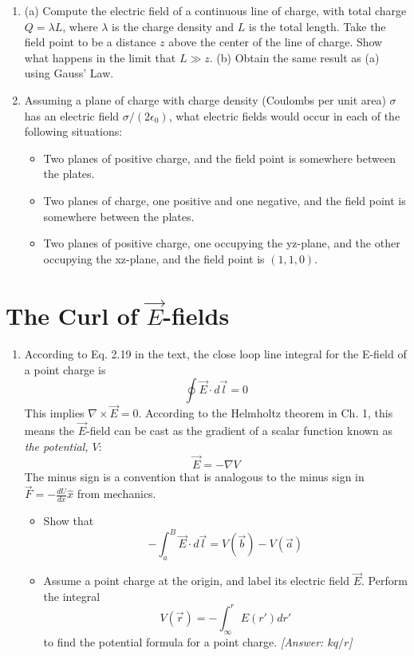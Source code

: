 \documentclass[10pt]{article}
\begin{document}
\begin{enumerate}
\item (a) Compute the electric field of a continuous line of charge, with total charge $Q = \lambda L$, where $\lambda$ is the charge density and $L$ is the total length.  Take the field point to be a distance $z$ above the center of the line of charge.  Show what happens in the limit that $L \gg z$. (b) Obtain the same result as (a) using Gauss' Law. \\ \vspace{5cm}
\item Assuming a plane of charge with charge density (Coulombs per unit area) $\sigma$ has an electric field $\sigma/(2\epsilon_0)$, what electric fields would occur in each of the following situations:
\begin{itemize}
\item Two planes of positive charge, and the field point is somewhere between the plates.
\item Two planes of charge, one positive and one negative, and the field point is somewhere between the plates.
\item Two planes of positive charge, one occupying the yz-plane, and the other occupying the xz-plane, and the field point is $(1,1,0)$.
\end{itemize}
\vspace{3cm}
\end{enumerate}

\section{The Curl of $\vec{E}$-fields}

\begin{enumerate}
\item According to Eq. 2.19 in the text, the close loop line integral for the E-field of a point charge is 
\begin{equation}
\oint \vec{E} \cdot d\vec{l} = 0
\end{equation}
This implies $\nabla \times \vec{E} = 0$.  According to the Helmholtz theorem in Ch. 1, this means the $\vec{E}$-field can be cast as the gradient of a scalar function known as \textit{the potential, $V$}:
\begin{equation}
\vec{E} = -\nabla V
\end{equation}
The minus sign is a convention that is analogous to the minus sign in $\vec{F} = - \frac{dU}{dx} \hat{x}$ from mechanics.
\begin{itemize}
\item Show that 
\begin{equation}
- \int_a^{B} \vec{E} \cdot d\vec{l} = V(\vec{b}) - V(\vec{a})
\end{equation}
\item Assume a point charge at the origin, and label its electric field $\vec{E}$.  Perform the integral
\begin{equation}
V(\vec{r}) = - \int_{\infty}^{r} E(r') dr'
\end{equation}
to find the potential formula for a point charge. \textit{[Answer: $kq/r$]}
\end{itemize}
\end{enumerate}
\end{document}
